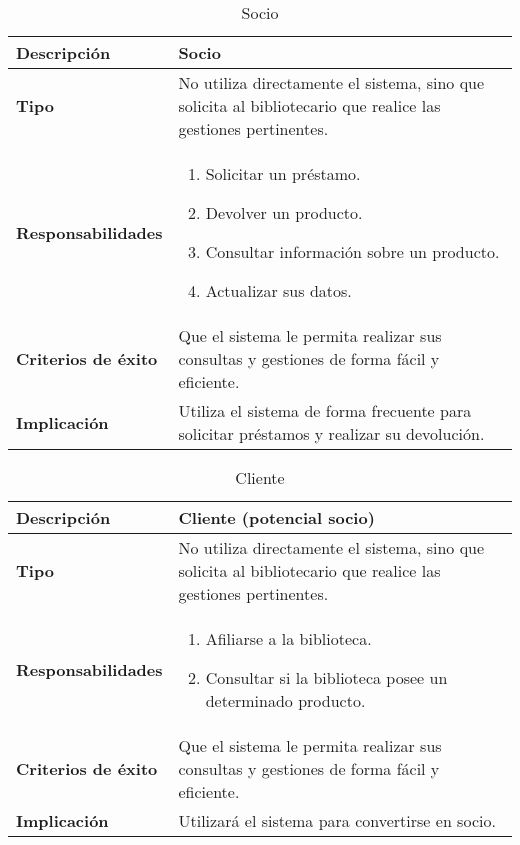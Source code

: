 \documentclass[12pt,spanish]{article}
\begin{document}
\begin{table}[H]
\begin{center}
\begin{tabular}{|m{6cm}|m{6cm}|}
\hline
\textbf{Descripción} & Socio \\
\hline
\textbf{Tipo} & No utiliza directamente el sistema, sino que solicita al bibliotecario que realice las gestiones pertinentes. \\
\hline
\textbf{Responsabilidades} & 
\begin{minipage}{6cm}
    \vskip 1pt
    \begin{enumerate}
   		\item Solicitar un préstamo.
   		\item Devolver un producto.
     	\item Consultar información sobre un producto.
     	\item Actualizar sus datos.
   \end{enumerate}
   \vskip 1pt
 \end{minipage}\\ 
\hline
\textbf{Criterios de éxito} & Que el sistema le permita realizar sus consultas y gestiones de forma fácil y eficiente.\\
\hline
\textbf{Implicación} & Utiliza el sistema de forma frecuente para solicitar préstamos y realizar su devolución. \\
\hline
\end{tabular}
\caption{Socio}
\end{center}
\end{table}

\begin{table}[H]
\begin{center}
\begin{tabular}{|m{6cm}|m{6cm}|}
\hline
\textbf{Descripción} & Cliente (potencial socio) \\
\hline
\textbf{Tipo} & No utiliza directamente el sistema, sino que solicita al bibliotecario que realice las gestiones pertinentes. \\
\hline
\textbf{Responsabilidades} & 
\begin{minipage}{6cm}
    \vskip 1pt
    \begin{enumerate}
   		\item Afiliarse a la biblioteca.
   		\item Consultar si la biblioteca posee un determinado producto.
   \end{enumerate}
   \vskip 1pt
 \end{minipage}\\ 
\hline
\textbf{Criterios de éxito} & Que el sistema le permita realizar sus consultas y gestiones de forma fácil y eficiente.\\
\hline
\textbf{Implicación} & Utilizará el sistema para convertirse en socio. \\
\hline
\end{tabular}
\caption{Cliente}
\end{center}
\end{table}


\end{document}
